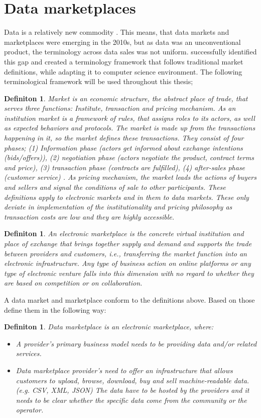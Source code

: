 \documentclass[a4paper,11pt]{report} %
\theoremstyle{change}
\theoremstyle{theoremstyle}
\newtheorem{defi}[theorem]{Definiton}
{\theorembodyfont{\rmfamily}
\newtheorem{note}[theorem]{Note}
\newtheorem{conseq}[theorem]{Consequence}
\newtheorem{eg}[theorem]{Example}
}%
\begin{document}
\section{Data marketplaces}
Data is a relatively new commodity \cite{haav2014data}. This means, that data markets and marketplaces were emerging in the 2010s, but as data was an unconventional product, the terminology across data sales was not uniform. \cite{stahl2016classification} successfully identified this gap and created a terminology framework that follows traditional market definitions, while adapting it to computer science environment. The following terminological framework will be used throughout this thesis;
\begin{defi}
    Market is an economic structure, the abstract place of trade, that serves three functions: Institute, transaction and pricing mechanism. As an institution market is a framework of rules, that assigns roles to its actors, as well as expected behaviors and protocols. The market is made up from the transactions happening in it, so the market defines these transactions. They consist of four phases; (1) Information phase (actors get informed about exchange intentions (bids/offers)), (2) negotiation phase (actors negotiate the product, contract terms and price), (3) transaction phase (contracts are fulfilled), (4) after-sales phase (customer service) \cite{richter2002elektronische}. As pricing mechanism, the market leads the actions of buyers and sellers and signal the conditions of sale to other participants. These definitions apply to electronic markets and in them to data markets. These only deviate in implementation of the institutionality and pricing philosophy as transaction costs are low and they are highly accessible.
\end{defi}
\begin{defi}
    An electronic marketplace is the concrete virtual institution and place of exchange that brings together supply and demand and supports the trade between providers and customers, i.e., transferring the market function into an electronic infrastructure. Any type of business action on online platforms or any type of electronic venture falls into this dimension with no regard to whether they are based on competition or on collaboration.
\end{defi}
A data market and marketplace conform to the definitions above. Based on those \cite{stahl2016classification} define them in the following way:
\begin{defi}
    Data marketplace is an electronic marketplace, where:
    \begin{itemize}
        \item A provider's primary business model needs to be providing data and/or related services. 
        \item Data marketplace provider's need to offer an infrastructure that allows customers to upload, browse, download, buy and sell machine-readable data. (e.g. CSV, XML, JSON) The data have to be hosted by the providers and it needs to be clear whether the specific data come from the community or the operator.
    \end{itemize}
\end{defi}
\end{document}

